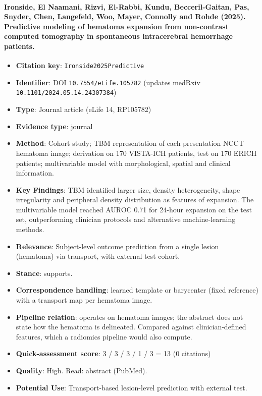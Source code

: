 \documentclass[journal,onecolumn]{IEEEtran}
\begin{document}
\paragraph{Ironside, El Naamani, Rizvi, El-Rabbi, Kundu, Becceril-Gaitan, Pas, Snyder, Chen, Langefeld, Woo, Mayer, Connolly and Rohde (2025). Predictive modeling of hematoma expansion from non-contrast computed tomography in spontaneous intracerebral hemorrhage patients.~\cite{Ironside2025Predictive}}\mbox{}

\begin{itemize}

\item{} \textbf{Citation key}: \texttt{Ironside2025Predictive}

\item{} \textbf{Identifier}: DOI \nolinkurl{10.7554/eLife.105782} (updates medRxiv \nolinkurl{10.1101/2024.05.14.24307384})

\item{} \textbf{Type}: Journal article (eLife 14, RP105782)

\item{} \textbf{Evidence type}: journal

\item{} \textbf{Method}: Cohort study; TBM representation of each presentation NCCT hematoma image; derivation on 170 VISTA-ICH patients, test on 170 ERICH patients; multivariable model with morphological, spatial and clinical information.

\item{} \textbf{Key Findings}: TBM identified larger size, density heterogeneity, shape irregularity and peripheral density distribution as features of expansion. The multivariable model reached AUROC 0.71 for 24-hour expansion on the test set, outperforming clinician protocols and alternative machine-learning methods.

\item{} \textbf{Relevance}: Subject-level outcome prediction from a single lesion (hematoma) via transport, with external test cohort.

\item{} \textbf{Stance}: supports.

\item{} \textbf{Correspondence handling}: learned template or barycenter (fixed reference) with a transport map per hematoma image.

\item{} \textbf{Pipeline relation}: operates on hematoma images; the abstract does not state how the hematoma is delineated. Compared against clinician-defined features, which a radiomics pipeline would also compute.

\item{} \textbf{Quick-assessment score}: 3 / 3 / 3 / 1 / 3 = 13 (0 citations)

\item{} \textbf{Quality}: High. Read: abstract (PubMed).

\item{} \textbf{Potential Use}: Transport-based lesion-level prediction with external test.

\end{itemize}
\end{document}
